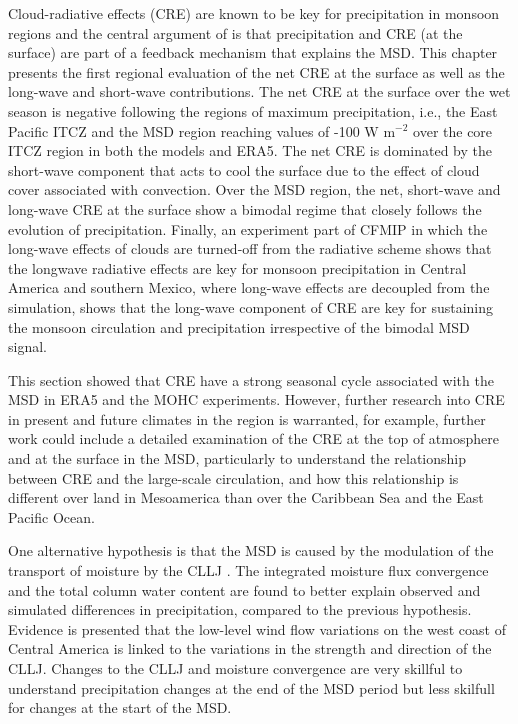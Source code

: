 Cloud-radiative effects (CRE) are known to be key for precipitation in monsoon regions and the central argument of \cite{magana1999} is that precipitation and CRE (at the surface) are part of a feedback mechanism that explains the MSD. This chapter presents the first regional evaluation of the net CRE at the surface as well as the long-wave and short-wave contributions. The net CRE at the surface over the wet season is negative following the regions of maximum precipitation, i.e., the East Pacific ITCZ and the MSD region reaching values of -100 W m$^{-2}$ over the core ITCZ region in both the models and ERA5. The net CRE is dominated by the short-wave component that acts to cool the surface due to the effect of cloud cover associated with convection. Over the MSD region, the net, short-wave and long-wave CRE at the surface show a bimodal regime that closely follows the evolution of precipitation. Finally, an experiment part of CFMIP in which the long-wave effects of clouds are turned-off from the radiative scheme shows that the longwave radiative effects are key for monsoon precipitation in Central America and southern Mexico,  where long-wave effects are decoupled from the simulation, shows that the long-wave component of CRE are key for sustaining the monsoon circulation and precipitation irrespective of the bimodal MSD signal.

This section showed that CRE have a strong seasonal cycle associated with the MSD in ERA5 and the MOHC experiments. However, further research into CRE in present and future climates in the region is warranted, for example, further work could include a detailed examination of the CRE at the top of atmosphere and at the surface in the MSD, particularly to understand the relationship between CRE and the large-scale circulation, and how this relationship is different over land in Mesoamerica than over the Caribbean Sea and the East Pacific Ocean.

One alternative hypothesis is that the MSD is caused by the modulation of the transport of moisture by the CLLJ \citep{herrera2015,zermeno2019,martinez2019}. The integrated moisture flux convergence and the total column water content are found to better explain observed and simulated differences in precipitation, compared to the previous hypothesis. Evidence is presented that the low-level wind flow variations on the west coast of Central America is linked to the variations in the strength and direction of the CLLJ. 
Changes to the CLLJ and moisture convergence are very skillful to understand precipitation changes at the end of the MSD period but less skilfull for changes at the start of the MSD. 

